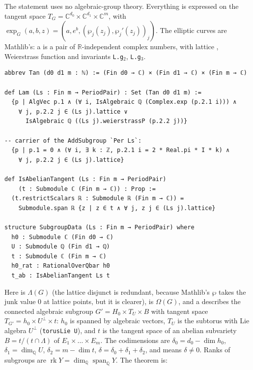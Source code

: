 \documentclass[11pt]{amsart}
\theoremstyle{definition}
\theoremstyle{remark}
\numberwithin{equation}{section}
\newcommand{\QQ}{\mathbb{Q}}
\newcommand{\RR}{\mathbb{R}}
\newcommand{\CC}{\mathbb{C}}
\newcommand{\rk}{\operatorname{rk}}
\begin{document}
The statement uses no algebraic-group theory. Everything is expressed on the tangent space
$T_G=\CC^{d_0}\times\CC^{d_1}\times\CC^m$, with $\exp_G(a,b,z)=(a,e^b,(\wp_j(z_j),\wp_j'(z_j))_j)$. The
elliptic curves are Mathlib's: a   is a pair of $\RR$-independent complex
numbers, with lattice , Weierstrass function  and invariants
\texttt{L.g}$_2$, \texttt{L.g}$_3$.

\begin{Verbatim}[fontsize=\scriptsize]
abbrev Tan (d0 d1 m : ℕ) := (Fin d0 → ℂ) × (Fin d1 → ℂ) × (Fin m → ℂ)

def Lam (Ls : Fin m → PeriodPair) : Set (Tan d0 d1 m) :=
  {p | AlgVec p.1 ∧ (∀ i, IsAlgebraic ℚ (Complex.exp (p.2.1 i))) ∧
    ∀ j, p.2.2 j ∈ (Ls j).lattice ∨
      IsAlgebraic ℚ ((Ls j).weierstrassP (p.2.2 j))}

-- carrier of the AddSubgroup `Per Ls`:
  {p | p.1 = 0 ∧ (∀ i, ∃ k : ℤ, p.2.1 i = 2 * Real.pi * I * k) ∧
    ∀ j, p.2.2 j ∈ (Ls j).lattice}

def IsAbelianTangent (Ls : Fin m → PeriodPair)
    (t : Submodule ℂ (Fin m → ℂ)) : Prop :=
  (t.restrictScalars ℝ : Submodule ℝ (Fin m → ℂ)) =
    Submodule.span ℝ {z | z ∈ t ∧ ∀ j, z j ∈ (Ls j).lattice}

structure SubgroupData (Ls : Fin m → PeriodPair) where
  h0 : Submodule ℂ (Fin d0 → ℂ)
  U : Submodule ℚ (Fin d1 → ℚ)
  t : Submodule ℂ (Fin m → ℂ)
  h0_rat : RationalOverQbar h0
  t_ab : IsAbelianTangent Ls t
\end{Verbatim}

Here  is $\Lambda(G)$ (the lattice disjunct is redundant, because Mathlib's $\wp$ takes the
junk value $0$ at lattice points, but it is clearer),  is $\Omega(G)$, and a
 describes the connected algebraic subgroup $G'=H_0\times T_U\times B$ with
tangent space $T_{G'}=h_0\times U^\perp\times t$: $h_0$ is spanned by algebraic vectors, $T_U$ is the
subtorus with Lie algebra $U^\perp$ (\texttt{torusLie\ U}), and $t$ is the tangent space of an abelian
subvariety $B=t/(t\cap\Lambda)$ of $E_1\times\dots\times E_m$. The codimensions are
$\delta_0=d_0-\dim h_0$, $\delta_1=\dim_\QQ U$, $\delta_2=m-\dim t$, $\delta=\delta_0+\delta_1+\delta_2$, and
 means $\delta\ne0$. Ranks of subgroups are $\rk Y=\dim_\QQ\operatorname{span}_\QQ Y$. The
theorem is:
\end{document}
